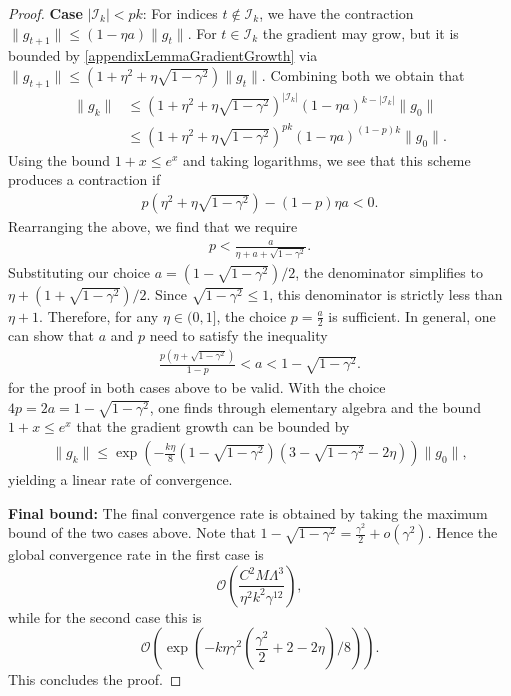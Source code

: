 \documentclass{article}
\theoremstyle{plain}
\theoremstyle{definition}
\theoremstyle{remark}
\begin{document}
\begin{proof}
    \textbf{Case} $|\mathcal{I}_k| < pk$:
    For indices $t\notin \mathcal{I}_k$, we have the contraction $\|g_{t+1}\| \leq (1-\eta a) \|g_t\|$. For $t \in \mathcal{I}_k$ the gradient may grow, but it is bounded by \cref{appendixLemmaGradientGrowth} via $\|g_{t+1}\| \leq \left(1 + \eta^2 + \eta \sqrt{1-\gamma^2}\right) \|g_t\|$. Combining both we obtain that
    \begin{align}
        \|g_k\| 
        &\leq \left(1 + \eta^2 + \eta \sqrt{1-\gamma^2}\right)^{|\mathcal{I}_k|} (1-\eta a)^{k-|\mathcal{I}_k|} \|g_0\|\\
        &\leq \left(1 + \eta^2 + \eta \sqrt{1-\gamma^2}\right)^{pk}(1-\eta a)^{(1-p)k} \|g_0\|.
    \end{align}
    Using the bound $1+x \leq e^x$ and taking logarithms, we see that this scheme produces a contraction if
    \begin{align}
        p\left( \eta^2 + \eta \sqrt{1-\gamma^2} \right) - (1-p)\eta a < 0.
    \end{align}
    Rearranging the above, we find that we require
    \begin{align}
        p < \frac{a}{\eta + a + \sqrt{1-\gamma^2}}.
    \end{align}
    Substituting our choice $a = (1-\sqrt{1-\gamma^2})/2$, the denominator simplifies to $\eta + (1+\sqrt{1-\gamma^2})/2$. Since $\sqrt{1-\gamma^2} \leq 1$, this denominator is strictly less than $\eta + 1$. Therefore, for any $\eta \in (0, 1]$, the choice $p = \frac{a}{2}$ is sufficient. In general, one can show that $a$ and $p$ need to satisfy the inequality
    \begin{align}
        \frac{p\left(\eta+\sqrt{1-\gamma^2}\right)}{1-p} < a <1-\sqrt{1-\gamma^2}.
    \end{align}
    for the proof in both cases above to be valid. With the choice $4p = 2a = 1-\sqrt{1-\gamma^2}$, one finds through elementary algebra and the bound $1+x \leq e^x$ that the gradient growth can be bounded by
    \begin{align}
        \|g_k\| \leq \exp\left( - \frac{k\eta}{8}(1-\sqrt{1-\gamma^2})(3-\sqrt{1-\gamma^2}-2\eta) \right) \|g_0\|,
    \end{align}
    yielding a linear rate of convergence.
    
    \textbf{Final bound:} The final convergence rate is obtained by taking the maximum bound of the two cases above. Note that $1-\sqrt{1-\gamma^2} = \frac{\gamma^2}{2} + o(\gamma^2)$. Hence the global convergence rate in the first case is 
    \begin{equation}
        \mathcal{O}\left(\frac{C^2M \Lambda^3}{\eta^2 k^2 \gamma^{12}}\right),
    \end{equation}
    while for the second case this is 
    \begin{equation}
        \mathcal{O}\left(\exp\left(-k\eta\gamma^2\left(\frac{\gamma^2}{2} +2-2\eta\right) / 8\right)\right).
    \end{equation}
    This concludes the proof.
\end{proof}
\end{document}
